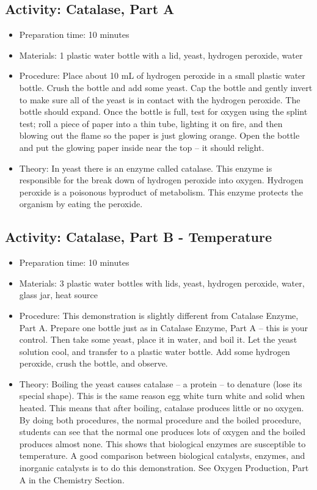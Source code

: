 \subsection{Activity: Catalase, Part A}
\begin{itemize}
\item{Preparation time: 10 minutes}
\item{Materials: 1 plastic water bottle with a lid, yeast, hydrogen peroxide, water}
\item{Procedure: Place about 10 mL of hydrogen peroxide in a small plastic water bottle. Crush the bottle and add some yeast. Cap the bottle and gently invert to make sure all of the yeast is in contact with the hydrogen peroxide. The bottle should expand. Once the bottle is full, test for oxygen using the splint test; roll a piece of paper into a thin tube, lighting it on fire, and then blowing out the flame so the paper is just glowing orange. Open the bottle and put the glowing paper inside near the top – it should relight.}
\item{Theory: In yeast there is an enzyme called catalase. This enzyme is responsible for the break down of hydrogen peroxide into oxygen. Hydrogen peroxide is a poisonous byproduct of metabolism. This enzyme protects the organism by eating the peroxide.}
\end{itemize}

\subsection{Activity: Catalase, Part B - Temperature}
\begin{itemize}
\item{Preparation time: 10 minutes}
\item{Materials: 3 plastic water bottles with lids, yeast, hydrogen peroxide, water, glass jar, heat source}
\item{Procedure: This demonstration is slightly different from Catalase Enzyme, Part A. Prepare one bottle just as in Catalase Enzyme, Part A – this is your control. Then take some yeast, place it in water, and boil it. Let the yeast solution cool, and transfer to a plastic water bottle. Add some hydrogen peroxide, crush the bottle, and observe.}
\item{Theory: Boiling the yeast causes catalase – a protein – to denature (lose its special shape). This is the same reason egg white turn white and solid when heated. This means that after boiling, catalase produces little or no oxygen. By doing both procedures, the normal procedure and the boiled procedure, students can see that the normal one produces lots of oxygen and the boiled produces almost none. This shows that biological enzymes are susceptible to temperature. A good comparison between biological catalysts, enzymes, and inorganic catalysts is to do this demonstration. See Oxygen Production, Part A in the Chemistry Section.}
\end{itemize}

